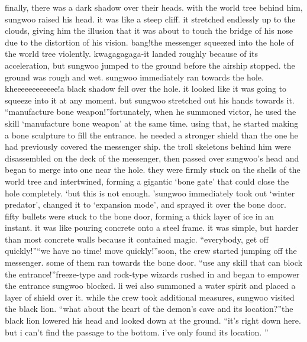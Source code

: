 finally, there was a dark shadow over their heads.
 with the world tree behind him, sungwoo raised his head.
 it was like a steep cliff.
 it stretched endlessly up to the clouds, giving him the illusion that it was about to touch the bridge of his nose due to the distortion of his vision.
bang!the messenger squeezed into the hole of the world tree violently.
kwagagagaga-it landed roughly because of its acceleration, but sungwoo jumped to the ground before the airship stopped.
 the ground was rough and wet.
sungwoo immediately ran towards the hole.
kheeeeeeeeeeee!a black shadow fell over the hole.
 it looked like it was going to squeeze into it at any moment.
but sungwoo stretched out his hands towards it.
“manufacture bone weapon!”fortunately, when he summoned victor, he used the skill ‘manufacture bone weapon’ at the same time.
 using that, he started making a bone sculpture to fill the entrance.
 he needed a stronger shield than the one he had previously covered the messenger ship.
the troll skeletons behind him were disassembled on the deck of the messenger, then passed over sungwoo’s head and began to merge into one near the hole.
they were firmly stuck on the shells of the world tree and intertwined, forming a gigantic ‘bone gate’ that could close the hole completely.
‘but this is not enough.
’sungwoo immediately took out ‘winter predator’, changed it to ‘expansion mode’, and sprayed it over the bone door.
fifty bullets were stuck to the bone door, forming a thick layer of ice in an instant.
it was like pouring concrete onto a steel frame.
 it was simple, but harder than most concrete walls because it contained magic.
“everybody, get off quickly!”“we have no time! move quickly!”soon, the crew started jumping off the messenger.
 some of them ran towards the bone door.
“use any skill that can block the entrance!”freeze-type and rock-type wizards rushed in and began to empower the entrance sungwoo blocked.
 li wei also summoned a water spirit and placed a layer of shield over it.
while the crew took additional measures, sungwoo visited the black lion.
“what about the heart of the demon’s cave and its location?”the black lion lowered his head and looked down at the ground.
“it’s right down here.
 but i can’t find the passage to the bottom.
 i’ve only found its location.
”

